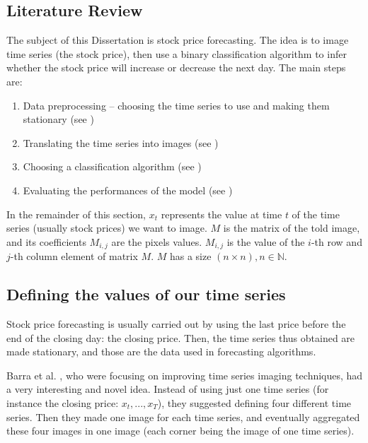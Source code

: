 \documentclass[11pt]{article}
\begin{document}
\begin{onehalfspace}
\pagebreak

\section{Literature Review}

\label{sect_littrev}

The subject of this Dissertation is stock price forecasting. The idea is to image time series (the stock price), then use a binary classification algorithm to infer whether the stock price will increase or decrease the next day. The main steps are:

\begin{enumerate}
    \item Data preprocessing -- choosing the time series to use and making them stationary (see )
    \item Translating the time series into images (see )
    \item Choosing a classification algorithm (see )
    \item Evaluating the performances of the model (see )
\end{enumerate}

In the remainder of this section, $x_t$ represents the value at time $t$ of the time series (usually stock prices) we want to image. $M$ is the matrix of the told image, and its coefficients $M_{i,j}$ are the pixels values. $M_{i,j}$ is the value of the $i$-th row and $j$-th column element of matrix $M$. $M$ has a size $(n \times n), n \in \mathbb{N}$.

\subsection{Defining the values of our time series}
\label{sec:LR_preprocess}

Stock price forecasting is usually carried out by using the last price before the end of the closing day: the closing price. Then, the time series thus obtained are made stationary, and those are the data used in forecasting algorithms.

Barra et al. \cite{barra}, who were focusing on improving time series imaging techniques, had a very interesting and novel idea. Instead of using just one time series (for instance the closing price: $x_t,...,x_T$), they suggested defining four different time series. Then they made one image for each time series, and eventually aggregated these four images in one image (each corner being the image of one time series). 


\end{onehalfspace}
\end{document}
